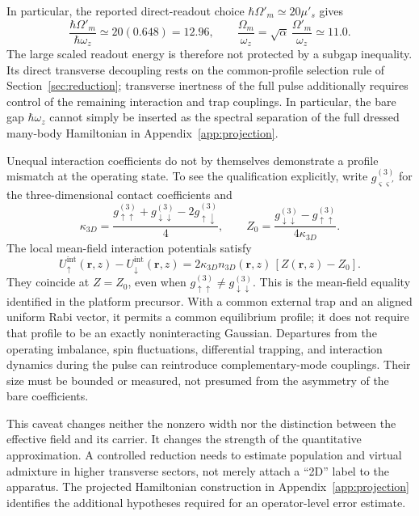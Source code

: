 \documentclass[11pt,a4paper]{article}
\theoremstyle{definition}
\theoremstyle{remark}
\newcommand{\musp}{\mu'_s}
\begin{document}
In particular, the reported direct-readout choice $\hbar\Omega'_m\simeq20\musp$ gives
\begin{equation}
 \frac{\hbar\Omega'_m}{\hbar\omega_z}
 \simeq20(0.648)=12.96,\qquad
 \frac{\Omega_m}{\omega_z}
 =\sqrt\alpha\,\frac{\Omega'_m}{\omega_z}\simeq11.0.
 \label{eq:readout_gap}
\end{equation}
The large scaled readout energy is therefore not protected by a subgap inequality. Its direct transverse decoupling rests on the common-profile selection rule of Section~\ref{sec:reduction}; transverse inertness of the full pulse additionally requires control of the remaining interaction and trap couplings. In particular, the bare gap $\hbar\omega_z$ cannot simply be inserted as the spectral separation of the full dressed many-body Hamiltonian in Appendix~\ref{app:projection}.\cite{zhang2026}

Unequal interaction coefficients do not by themselves demonstrate a profile mismatch at the operating state. To see the qualification explicitly, write $g^{(3)}_{\varsigma\varsigma'}$ for the three-dimensional contact coefficients and
\[
 \kappa_{3D}=\frac{g^{(3)}_{\uparrow\uparrow}
 +g^{(3)}_{\downarrow\downarrow}-2g^{(3)}_{\uparrow\downarrow}}4,
 \qquad
 Z_0=\frac{g^{(3)}_{\downarrow\downarrow}-g^{(3)}_{\uparrow\uparrow}}
 {4\kappa_{3D}}.
\]
The local mean-field interaction potentials satisfy
\[
 U^{\mathrm{int}}_\uparrow(\boldsymbol r,z)
 -U^{\mathrm{int}}_\downarrow(\boldsymbol r,z)
 =2\kappa_{3D}n_{3D}(\boldsymbol r,z)\,[Z(\boldsymbol r,z)-Z_0].
\]
They coincide at $Z=Z_0$, even when $g^{(3)}_{\uparrow\uparrow}\ne g^{(3)}_{\downarrow\downarrow}$. This is the mean-field equality identified in the platform precursor. With a common external trap and an aligned uniform Rabi vector, it permits a common equilibrium profile; it does not require that profile to be an exactly noninteracting Gaussian. Departures from the operating imbalance, spin fluctuations, differential trapping, and interaction dynamics during the pulse can reintroduce complementary-mode couplings. Their size must be bounded or measured, not presumed from the asymmetry of the bare coefficients.\cite{precursor,zhang2026}

This caveat changes neither the nonzero width nor the distinction between the effective field and its carrier. It changes the strength of the quantitative approximation. A controlled reduction needs to estimate population and virtual admixture in higher transverse sectors, not merely attach a ``2D'' label to the apparatus. The projected Hamiltonian construction in Appendix~\ref{app:projection} identifies the additional hypotheses required for an operator-level error estimate.
\end{document}
